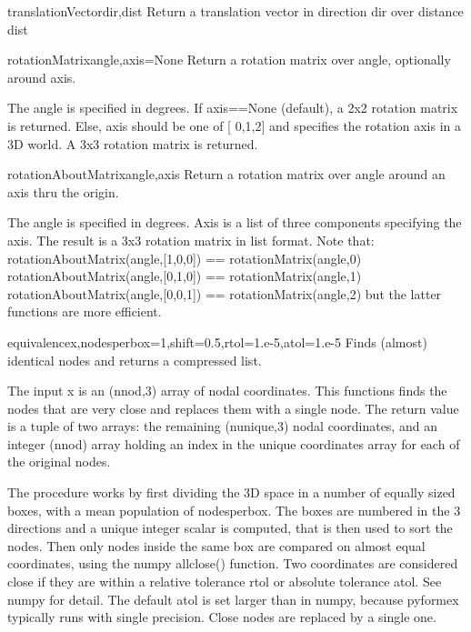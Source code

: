 {{\begin{funcdesc}{translationVector}{dir,dist}
    Return a translation vector in direction dir over distance dist
\end{funcdesc}

\begin{funcdesc}{rotationMatrix}{angle,axis=None}
    Return a rotation matrix over angle, optionally around axis.

    The angle is specified in degrees.
    If axis==None (default), a 2x2 rotation matrix is returned.
    Else, axis should be one of [ 0,1,2] and specifies the rotation axis
    in a 3D world. A 3x3 rotation matrix is returned.
\end{funcdesc}
    

\begin{funcdesc}{rotationAboutMatrix}{angle,axis}
    Return a rotation matrix over angle around an axis thru the origin.

    The angle is specified in degrees.
    Axis is a list of three components specifying the axis.
    The result is a 3x3 rotation matrix in list format.
    Note that:
      rotationAboutMatrix(angle,[1,0,0]) == rotationMatrix(angle,0) 
      rotationAboutMatrix(angle,[0,1,0]) == rotationMatrix(angle,1) 
      rotationAboutMatrix(angle,[0,0,1]) == rotationMatrix(angle,2)
    but the latter functions are more efficient.
\end{funcdesc}
    


\begin{funcdesc}{equivalence}{x,nodesperbox=1,shift=0.5,rtol=1.e-5,atol=1.e-5}
    Finds (almost) identical nodes and returns a compressed list.

    The input x is an (nnod,3) array of nodal coordinates. This functions finds
    the nodes that are very close and replaces them with a single node.
    The return value is a tuple of two arrays: the remaining (nunique,3) nodal
    coordinates, and an integer (nnod) array holding an index in the unique
    coordinates array for each of the original nodes.

    The procedure works by first dividing the 3D space in a number of
    equally sized boxes, with a mean population of nodesperbox.
    The boxes are numbered in the 3 directions and a unique integer scalar
    is computed, that is then used to sort the nodes.
    Then only nodes inside the same box are compared on almost equal
    coordinates, using the numpy allclose() function. Two coordinates are
    considered close if they are within a relative tolerance rtol or absolute
    tolerance atol. See numpy for detail. The default atol is set larger than
    in numpy, because pyformex typically runs with single precision.
    Close nodes are replaced by a single one.


\end{funcdesc}}}
